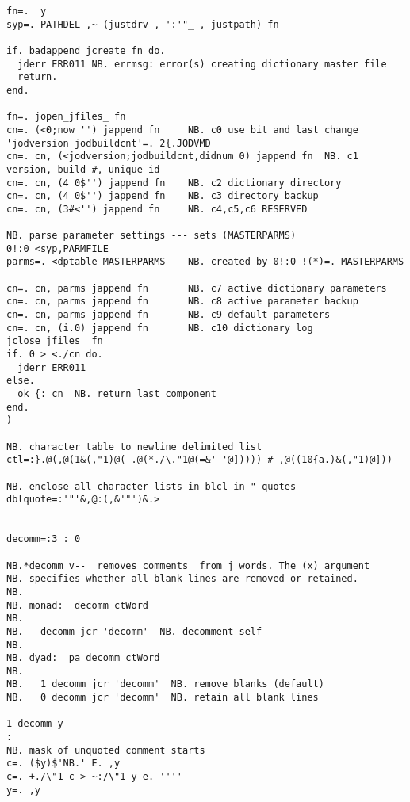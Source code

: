 \begin{lstlisting}[frame=single,framerule=0pt,basicstyle=\ttfamily\tiny]
fn=.  y
syp=. PATHDEL ,~ (justdrv , ':'"_ , justpath) fn

if. badappend jcreate fn do.
  jderr ERR011 NB. errmsg: error(s) creating dictionary master file
  return.
end.

fn=. jopen_jfiles_ fn
cn=. (<0;now '') jappend fn     NB. c0 use bit and last change
'jodversion jodbuildcnt'=. 2{.JODVMD
cn=. cn, (<jodversion;jodbuildcnt,didnum 0) jappend fn  NB. c1 version, build #, unique id
cn=. cn, (4 0$'') jappend fn    NB. c2 dictionary directory
cn=. cn, (4 0$'') jappend fn    NB. c3 directory backup
cn=. cn, (3#<'') jappend fn     NB. c4,c5,c6 RESERVED

NB. parse parameter settings --- sets (MASTERPARMS)
0!:0 <syp,PARMFILE
parms=. <dptable MASTERPARMS    NB. created by 0!:0 !(*)=. MASTERPARMS

cn=. cn, parms jappend fn       NB. c7 active dictionary parameters
cn=. cn, parms jappend fn       NB. c8 active parameter backup
cn=. cn, parms jappend fn       NB. c9 default parameters
cn=. cn, (i.0) jappend fn       NB. c10 dictionary log
jclose_jfiles_ fn
if. 0 > <./cn do.
  jderr ERR011
else.
  ok {: cn  NB. return last component
end.
)

NB. character table to newline delimited list
ctl=:}.@(,@(1&(,"1)@(-.@(*./\."1@(=&' '@])))) # ,@((10{a.)&(,"1)@]))

NB. enclose all character lists in blcl in " quotes
dblquote=:'"'&,@:(,&'"')&.>


decomm=:3 : 0
                                                                 
NB.*decomm v--  removes comments  from j words. The (x) argument
NB. specifies whether all blank lines are removed or retained.   
NB.                                                              
NB. monad:  decomm ctWord                                        
NB.                                                              
NB.   decomm jcr 'decomm'  NB. decomment self                    
NB.                                                              
NB. dyad:  pa decomm ctWord                                      
NB.                                                              
NB.   1 decomm jcr 'decomm'  NB. remove blanks (default)         
NB.   0 decomm jcr 'decomm'  NB. retain all blank lines          
                                                                 
1 decomm y                                                      
:
NB. mask of unquoted comment starts                              
c=. ($y)$'NB.' E. ,y                                           
c=. +./\"1 c > ~:/\"1 y e. ''''                                 
y=. ,y                                                         
                                                                 

\end{lstlisting}
